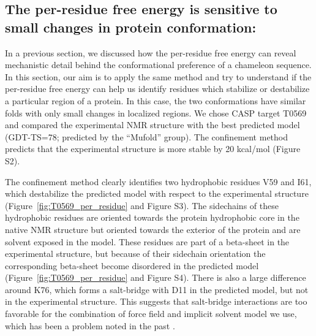 \documentclass[12pt]{article}
\begin{document}
\subsection*{The per-residue free energy is sensitive to small changes in protein conformation:}

In a previous section, we discussed how the per-residue free energy can reveal mechanistic
detail behind the conformational preference of a chameleon sequence. In this section, our aim is to apply the same
method and try to understand if the per-residue free energy can help us identify residues which stabilize or destabilize
a particular region of a protein. In this case, the two conformations have similar folds with only small changes in
localized regions. We chose CASP target T0569 and compared the experimental NMR structure with the best predicted model
(GDT-TS=78; predicted by the ``Mufold'' group). The confinement method predicts that the experimental structure is more stable
by 20 kcal/mol (Figure S2).

The confinement method clearly identifies two hydrophobic residues V59 and I61, which destabilize the predicted model
with respect to the experimental structure (Figure~\ref{fig:T0569_per_residue} and Figure S3). The sidechains of
these hydrophobic residues are oriented towards the protein hydrophobic core in the native NMR structure but oriented
towards the exterior of the protein and are solvent exposed in the model. These residues are part of a beta-sheet
in the experimental structure, but because of their sidechain orientation the corresponding beta-sheet become disordered in the predicted model 
(Figure~\ref{fig:T0569_per_residue} and Figure S4). There is also a large
difference around K76, which forms a salt-bridge with D11 in the predicted model, but not in the experimental structure.
This suggests that salt-bridge interactions are too favorable for the combination of force field and implicit solvent
model we use, which has been a problem noted in the past \cite{Roe2007}.
\end{document}
